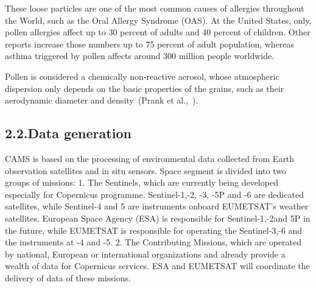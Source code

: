 \documentclass[9pt]{report}
\begin{document}
These loose particles are one of the most common causes of allergies throughout the World, such as the Oral Allergy Syndrome (OAS).
At the United States, only, pollen allergies affect up to 30 percent of adults and 40 percent of children.
Other reports increase those numbers up to 75 percent of adult population, whereas asthma triggered by pollen affects around 300 million people worldwide.%

Pollen is considered a chemically non-reactive aerosol, whose atmospheric dispersion only depends on the basic properties of the grains, such as their aerodynamic diameter and density~(Prank et al.,~).%

\subsection{2.2.\hspace*{0.5em}Data generation}\label{sec-data-generation}%

\noindent{}CAMS is based on the processing of environmental data collected from Earth observation satellites and in situ sensors.
Space segment is divided into two groups of missions:
1. The Sentinels, which are currently being developed especially for Copernicus programme. Sentinel-1,-2, -3, -5P and -6 are dedicated satellites, while Sentinel-4 and 5 are instruments onboard EUMETSAT’s weather satellites. European Space Agency (ESA) is responsible for Sentinel-1,-2and 5P in the future, while EUMETSAT is responsible for operating the Sentinel-3,-6 and the instruments at -4 and -5.
2. The Contributing Missions, which are operated by national, European or international organizations and already provide a wealth of data for Copernicus services. ESA and EUMETSAT will coordinate the delivery of data of these missions.%
\end{document}

